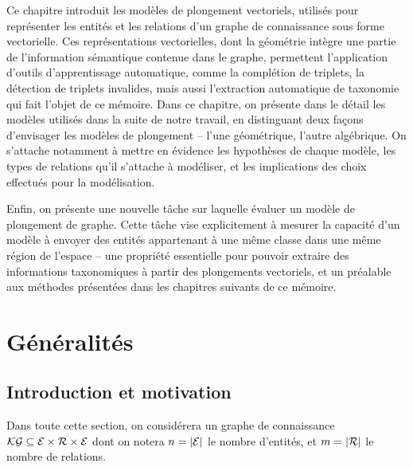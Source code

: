 \label{chap:kge}

Ce chapitre introduit les modèles de plongement vectoriels, utilisés pour représenter les entités et les relations d'un graphe de connaissance sous forme vectorielle. Ces représentations vectorielles, dont la géométrie intègre une partie de l'information sémantique contenue dans le graphe, permettent l'application d'outils d'apprentissage automatique, comme la complétion de triplets, la détection de triplets invalides, mais aussi l'extraction automatique de taxonomie qui fait l'objet de ce mémoire. Dans ce chapitre, on présente dans le détail les modèles utilisés dans la suite de notre travail, en distinguant deux façons d'envisager les modèles de plongement – l'une géométrique, l'autre algébrique. On s'attache notamment à mettre en évidence les hypothèses de chaque modèle, les types de relations qu'il s'attache à modéliser, et les implications des choix effectués pour la modélisation. %

Enfin, on présente une nouvelle tâche sur laquelle évaluer un modèle de plongement de graphe. Cette tâche vise explicitement à mesurer la capacité d'un modèle à envoyer des entités appartenant à une même classe dans une même région de l'espace – une propriété essentielle pour pouvoir extraire des informations taxonomiques à partir des plongements vectoriels, et un préalable aux méthodes présentées dans les chapitres suivants de ce mémoire.


\section{Généralités}
\label{sec:kge-general}


\subsection{Introduction et motivation}
\label{subsec:kge-general-intro}



Dans toute cette section, on considérera un graphe de connaissance $\mathcal{KG} \subseteq \mathcal{E} \times \mathcal{R} \times \mathcal{E}$ dont on notera $n = | \mathcal{E} |$ le nombre d'entités, et $m = |\mathcal{R} |$ le nombre de relations.


